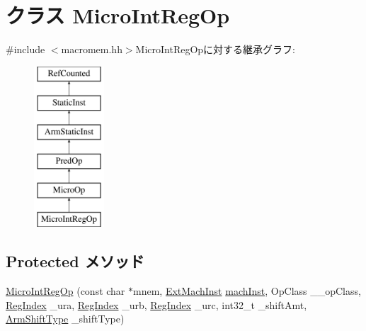 \hypertarget{classArmISA_1_1MicroIntRegOp}{
\section{クラス MicroIntRegOp}
\label{classArmISA_1_1MicroIntRegOp}
}


{\ttfamily \#include $<$macromem.hh$>$}MicroIntRegOpに対する継承グラフ:\begin{figure}[H]
\begin{center}
\leavevmode
\includegraphics[height=6cm]{classArmISA_1_1MicroIntRegOp}
\end{center}
\end{figure}
\subsection*{Protected メソッド}
\begin{DoxyCompactItemize}
\item 
\hyperlink{classArmISA_1_1MicroIntRegOp_afdd1f2b049ef59e4297a31709dc79a88}{MicroIntRegOp} (const char $\ast$mnem, \hyperlink{classStaticInst_a5605d4fc727eae9e595325c90c0ec108}{ExtMachInst} \hyperlink{classStaticInst_a744598b194ca3d4201d9414ce4cc4af4}{machInst}, OpClass \_\-\_\-opClass, \hyperlink{classStaticInst_a36d25e03e43fa3bb4c5482cbefe5e0fb}{RegIndex} \_\-ura, \hyperlink{classStaticInst_a36d25e03e43fa3bb4c5482cbefe5e0fb}{RegIndex} \_\-urb, \hyperlink{classStaticInst_a36d25e03e43fa3bb4c5482cbefe5e0fb}{RegIndex} \_\-urc, int32\_\-t \_\-shiftAmt, \hyperlink{namespaceArmISA_a209d79feaaef0aa2f54ae62e53ee90de}{ArmShiftType} \_\-shiftType)
\end{DoxyCompactItemize}
